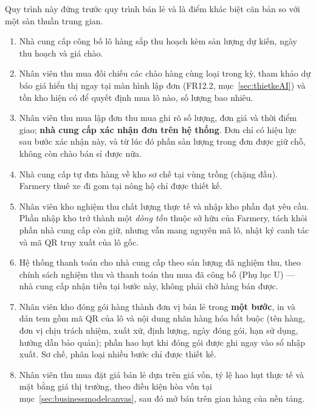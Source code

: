 Quy trình này đứng trước quy trình bán lẻ và là điểm khác biệt căn bản so với một sàn thuần trung gian.

\begin{enumerate}
    \item Nhà cung cấp công bố lô hàng sắp thu hoạch kèm sản lượng dự kiến, ngày thu hoạch và giá chào.
    \item Nhân viên thu mua đối chiếu các chào hàng cùng loại trong kỳ, tham khảo dự báo giá hiển thị ngay tại màn hình lập đơn (FR12.2, mục~\ref{sec:thietkeAI}) và tồn kho hiện có để quyết định mua lô nào, số lượng bao nhiêu.
    \item Nhân viên thu mua lập đơn thu mua ghi rõ số lượng, đơn giá và thời điểm giao; \textbf{nhà cung cấp xác nhận đơn trên hệ thống}. Đơn chỉ có hiệu lực sau bước xác nhận này, và từ lúc đó phần sản lượng trong đơn được giữ chỗ, không còn chào bán sỉ được nữa.
    \item Nhà cung cấp tự đưa hàng về kho sơ chế tại vùng trồng (chặng đầu). Farmery thuê xe đi gom tại nông hộ chỉ được thiết kế.
    \item Nhân viên kho nghiệm thu chất lượng thực tế và nhập kho phần đạt yêu cầu. Phần nhập kho trở thành một \emph{dòng tồn} thuộc sở hữu của Farmery, tách khỏi phần nhà cung cấp còn giữ, nhưng vẫn mang nguyên mã lô, nhật ký canh tác và mã QR truy xuất của lô gốc.
    \item Hệ thống thanh toán cho nhà cung cấp theo sản lượng đã nghiệm thu, theo chính sách nghiệm thu và thanh toán thu mua đã công bố (Phụ lục U) --- nhà cung cấp nhận tiền tại bước này, không phải chờ hàng bán được.
    \item Nhân viên kho đóng gói hàng thành đơn vị bán lẻ trong \textbf{một bước}, in và dán tem gồm mã QR của lô và nội dung nhãn hàng hóa bắt buộc (tên hàng, đơn vị chịu trách nhiệm, xuất xứ, định lượng, ngày đóng gói, hạn sử dụng, hướng dẫn bảo quản); phần hao hụt khi đóng gói được ghi ngay vào sổ nhập xuất. Sơ chế, phân loại nhiều bước chỉ được thiết kế.
    \item Nhân viên thu mua đặt giá bán lẻ dựa trên giá vốn, tỷ lệ hao hụt thực tế và mặt bằng giá thị trường, theo điều kiện hòa vốn tại mục~\ref{sec:businessmodelcanvas}, sau đó mở bán trên gian hàng của nền tảng.
\end{enumerate}

